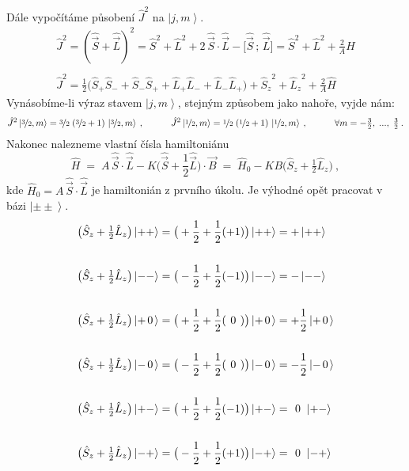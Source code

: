 \documentclass[10pt,a4paper]{article}
\newcommand*{\mask}[2]{%
    \mathord{\makebox[\widthof{\(#1\)}]{\(#2\)}}%
}
\newcommand{\ket}[1]{\left| #1 \right>}
\newcommand{\vechat}[1]{\hat{\vec{#1}}}
\def\0{\mask{+}{0}}
\begin{document}
Dále vypočítáme působení $\hat J^2$ na $\ket{j,m}$.
\begin{gather*}
    \hat J^2
    = \left( \vechat S + \vechat L \right)^2
    = \hat S^2 + \hat L^2 + 2 \, \vechat S \cdot \vechat L - \big[ \vechat S \,{;}\, \vechat L \big]
    = \hat S^2 + \hat L^2 + \frac{2}{A} \hat H
    \\\\
    \hat J^2
    = \frac{1}{2} \big(
        \hat S_+ \hat S_- +
        \hat S_- \hat S_+ +
        \hat L_+ \hat L_- +
        \hat L_- \hat L_+
    \big)
    + {\hat S_z}^2 + {\hat L_z}^2
    + \frac{2}{A} \hat H
\end{gather*}
Vynásobíme-li výraz stavem $\ket{j,m}$, stejným způsobem jako nahoře, vyjde nám:
\begin{equation*}
    \hat J^2 \ket{\nicefrac{3}{2}, m}
    = \nicefrac{3}{2} \; (\nicefrac{3}{2} + 1) \,
    \ket{\nicefrac{3}{2}, m}
    \: , \hspace{3em}
    \hat J^2 \ket{\nicefrac{1}{2}, m}
    = \nicefrac{1}{2} \; (\nicefrac{1}{2} + 1) \,
    \ket{\nicefrac{1}{2}, m}
    \: , \hspace{3em}
    \forall m = -\tfrac{3}{2}, \; {...}, \; \tfrac{3}{2}
    \: .
\end{equation*}
Nakonec nalezneme vlastní čísla hamiltoniánu
\begin{equation*}
    \hat H
    \; = \;
    A \, \vechat S \cdot \vechat L
    - K \big( \vechat S + \frac{1}{2} \vechat L \big) \cdot \vec B
    \; = \;
    \hat H_0 - KB
    \big( \hat S_z + \tfrac{1}{2} \hat L_z \big)
    \: ,
\end{equation*}
kde $\hat H_0 = A \, \vechat S \cdot \vechat L$ je hamiltonián z prvního úkolu. Je výhodné opět pracovat v bázi $\ket{\pm\pm}$.
\begin{align*}
    \big( \hat S_z + \tfrac{1}{2} \hat L_z \big) \ket{++}
    &=
    \big( +\frac{1}{2} + \frac{1}{2} (+1) \big) \ket{++}
    = +\ket{++}
    \\\\
    \big( \hat S_z + \tfrac{1}{2} \hat L_z \big) \ket{--}
    &=
    \big( -\frac{1}{2} + \frac{1}{2} (-1) \big) \ket{--}
    = -\ket{--}
    \\\\
    \big( \hat S_z + \tfrac{1}{2} \hat L_z \big) \ket{+\0}
    &=
    \big( +\frac{1}{2} + \frac{1}{2} (\mask{+1}{0}) \big) \ket{+\0}
    = +\frac{1}{2} \ket{+\0}
    \\\\
    \big( \hat S_z + \tfrac{1}{2} \hat L_z \big) \ket{-\0}
    &=
    \big( -\frac{1}{2} + \frac{1}{2} (\mask{+1}{0}) \big) \ket{-\0}
    = -\frac{1}{2} \ket{-\0}
    \\\\
    \big( \hat S_z + \tfrac{1}{2} \hat L_z \big) \ket{+-}
    &=
    \big( +\frac{1}{2} + \frac{1}{2} (-1) \big) \ket{+-}
    = \mask{+1}{0} \ket{+-}
    \\\\
    \big( \hat S_z + \tfrac{1}{2} \hat L_z \big) \ket{-+}
    &=
    \big( -\frac{1}{2} + \frac{1}{2} (+1) \big) \ket{-+}
    = \mask{+1}{0} \ket{-+}
\end{align*}
\end{document}
